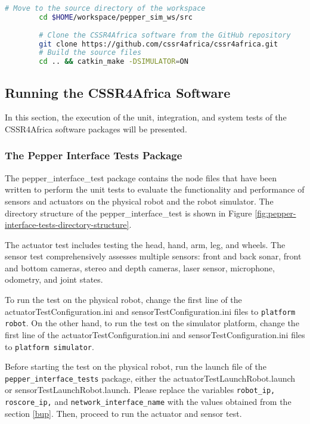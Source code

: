 \documentclass{CSSRforAfrica}
\begin{document}
{		\begin{lstlisting}[style=withoutNumbering, language=bash]
		# Move to the source directory of the workspace
		cd $HOME/workspace/pepper_sim_ws/src
		
		# Clone the CSSR4Africa software from the GitHub repository
		git clone https://github.com/cssr4africa/cssr4africa.git
		# Build the source files
		cd .. && catkin_make -DSIMULATOR=ON
		\end{lstlisting}
		
		\subsection{Running the CSSR4Africa Software}
		In this section, the execution of the unit, integration, and system tests of the CSSR4Africa software packages will be presented.
		
		\subsubsection{The Pepper Interface Tests Package}
		The pepper\_interface\_test package contains the node files that have been written to perform the unit tests to evaluate the functionality and performance of sensors and actuators on the physical robot and the robot simulator. The directory structure of the pepper\_interface\_test is shown in Figure \ref{fig:pepper-interface-tests-directory-structure}.
		
		The actuator test includes testing the head, hand, arm, leg, and wheels. The sensor test comprehensively assesses multiple sensors: front and back sonar, front and bottom cameras, stereo and depth cameras, laser sensor, microphone, odometry, and joint states.
		
		\noindent To run the test on the physical robot, change the first line of the actuatorTestConfiguration.ini and sensorTestConfiguration.ini files to \texttt{platform robot}. On the other hand, to run the test on the simulator platform, change the first line of the actuatorTestConfiguration.ini and sensorTestConfiguration.ini files to \texttt{platform simulator}. 
		
		\noindent Before starting the test on the physical robot, run the launch file of the \texttt{pepper\_interface\_tests} package, either the actuatorTestLaunchRobot.launch or sensorTestLaunchRobot.launch. Please replace the variables \texttt{robot\_ip, roscore\_ip,} and \texttt{network\_interface\_name} with the values obtained from the section \ref{bup}. Then, proceed to run the actuator and sensor test.\\
		
}
\end{document}
